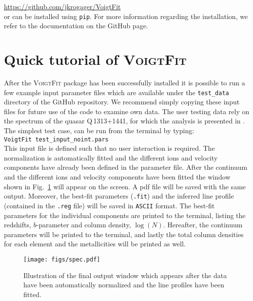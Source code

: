 \documentclass[a4paper]{article}
\begin{document}
\url{https://github.com/jkrogager/VoigtFit}\\

\noindent
or can be installed using \texttt{pip}.
For more information regarding the installation, we refer to the documentation on the GitHub page.


\clearpage


\section{Quick tutorial of \textsc{VoigtFit}} \label{sec:tutorial}

After the \textsc{VoigtFit} package has been successfully installed it is possible to run a few example input parameter files which are available under the \texttt{test\_data} directory of the GitHub repository.
We recommend simply copying these input files for future use of the code to examine own data. The user testing data rely on the spectrum of the quasar Q\,1313+1441, for which the analysis is presented in \citet{Krogager2017}. The simplest test case, can be run from the terminal by typing:\\

\texttt{VoigtFit test\_input\_noint.pars} \\

\noindent
This input file is defined such that no user interaction is required. The normalization is automatically fitted and the different ions and velocity components have already been defined in the parameter file. After the continuum and the different ions and velocity components have been fitted the window shown in Fig.~\ref{fig:spec} will appear on the screen. A pdf file will be saved with the same output. Moreover, the best-fit parameters (\texttt{.fit}) and the inferred line profile (contained in the \texttt{.reg} file) will be saved in \texttt{ASCII} format.
The best-fit parameters for the individual components are printed to the terminal, listing the redshifts, $b$-parameter and column density, $\log(N)$. Hereafter, the continuum parameters will be printed to the terminal, and lastly the total column densities for each element and the metallicities will be printed as well.


\begin{figure} [!h]
	\centering
	\texttt{[image: figs/spec.pdf]}
	\caption{Illustration of the final output window which appears after the data have been automatically normalized and the line profiles have been fitted.
	\label{fig:spec}}
\end{figure}
\end{document}
